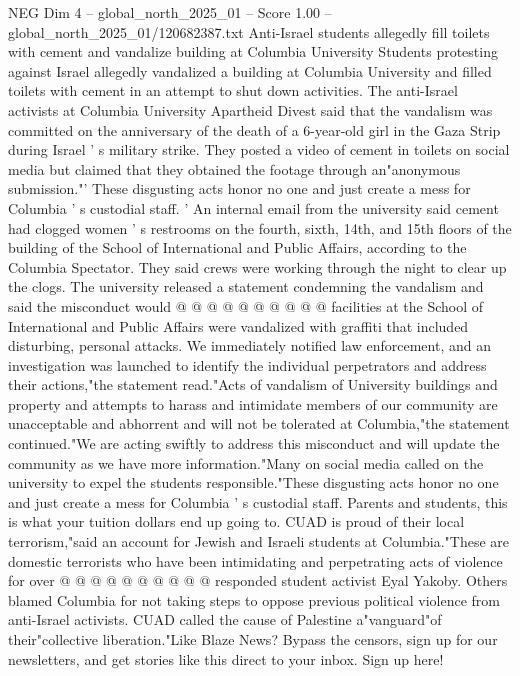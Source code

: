 \begin{textsample}{NEG Dim 4 – global\_north\_2025\_01 – Score 1.00 – global\_north\_2025\_01/120682387.txt}  \label{ex:f4_neg_411}
Anti-Israel students allegedly fill toilets with cement and vandalize building at Columbia University Students protesting against Israel allegedly vandalized a building at Columbia University and filled toilets with cement in an attempt to shut down activities.
The anti-Israel activists at Columbia University Apartheid Divest said that the vandalism was committed on the anniversary of the death of a 6-year-old girl in the Gaza Strip during Israel ' s military strike.
They posted a video of cement in toilets on social media but claimed that they obtained the footage through an"anonymous submission."' These disgusting acts honor no one and just create a mess for Columbia ' s custodial staff. ' An internal email from the university said cement had clogged women ' s restrooms on the fourth, sixth, 14th, and 15th floors of the building of the School of International and Public Affairs, according to the Columbia Spectator.
They said crews were working through the night to clear up the clogs.
The university released a statement condemning the vandalism and said the misconduct would @ @ @ @ @ @ @ @ @ @ facilities at the School of International and Public Affairs were vandalized with graffiti that included disturbing, personal attacks.
We immediately notified law enforcement, and an investigation was launched to identify the individual perpetrators and address their actions,"the statement read."Acts of vandalism of University buildings and property and attempts to harass and intimidate members of our community are unacceptable and abhorrent and will not be tolerated at Columbia,"the statement continued."We are acting swiftly to address this misconduct and will update the community as we have more information."Many on social media called on the university to expel the students responsible."These disgusting acts honor no one and just create a mess for Columbia ' s custodial staff.
Parents and students, this is what your tuition dollars end up going to.
CUAD is proud of their local terrorism,"said an account for Jewish and Israeli students at Columbia."These are domestic terrorists who have been intimidating and perpetrating acts of violence for over @ @ @ @ @ @ @ @ @ @ responded student activist Eyal Yakoby.
Others blamed Columbia for not taking steps to oppose previous political violence from anti-Israel activists.
CUAD called the cause of Palestine a"vanguard"of their"collective liberation."Like Blaze News?
Bypass the censors, sign up for our newsletters, and get stories like this direct to your inbox.
Sign up here!

\end{textsample}
